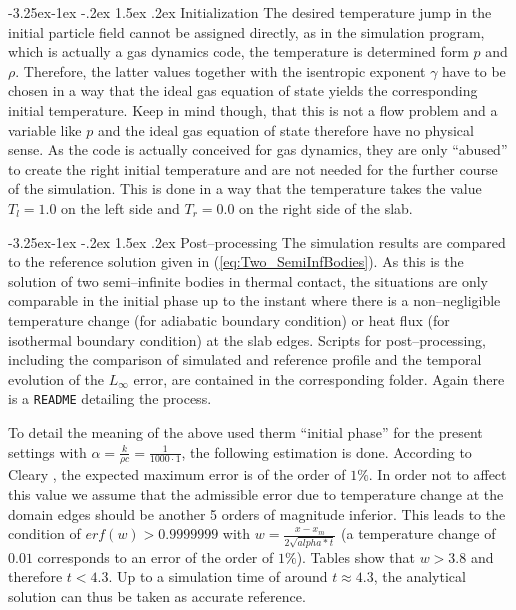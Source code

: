 \documentclass{report}
\makeatletter
\renewcommand\paragraph{\@startsection{paragraph}{4}{\z@}%
  {-3.25ex\@plus -1ex \@minus -.2ex}%
  {1.5ex \@plus .2ex}%
  {\normalfont\normalsize\bfseries}}
\makeatother
\begin{document}
\paragraph{Initialization}
The desired temperature jump in the initial particle field cannot be assigned directly, as in the simulation program, which is actually a gas dynamics code, the temperature is determined form $p$ and $\rho$. Therefore, the latter values together with the isentropic exponent $\gamma$ have to be chosen in a way that the ideal gas equation of state yields the corresponding initial temperature. Keep in mind though, that this is not a flow problem and a variable like $p$ and the ideal gas equation of state therefore have no physical sense. As the code is actually conceived for gas dynamics, they are only ``abused'' to create the right initial temperature  and are not needed for the further course of the simulation.
This is done in a way that the temperature takes the value $T_l=1.0$ on the left side and $T_r=0.0$ on the right side of the slab.



\paragraph{Post--processing}
The simulation results are compared to the reference solution given in (\ref{eq:Two_SemiInfBodies}). As this is the solution of two semi--infinite bodies in thermal contact, the situations are only comparable in the initial phase up to the instant where there is a non--negligible temperature change (for adiabatic boundary condition) or heat flux (for isothermal boundary condition) at the slab edges.
Scripts for post--processing, including the comparison of simulated and reference profile and the temporal evolution of the $L_\infty$ error, are contained in the corresponding folder. Again there is a {\tt README} detailing the process.

To detail the meaning of the above used therm ``initial phase'' for the present settings with $\alpha=\frac{k}{\rho c}=\frac{1}{1000\cdot 1}$, the following estimation is done. According to Cleary \cite{Cleary1999}, the expected maximum error is of the order of $1\%$. In order not to affect this value we assume that the admissible error due to temperature change at the domain edges should be another 5 orders of magnitude inferior. This leads to the condition of $erf(w)>0.9999999$ 
with $w=\frac{x-x_m}{2\sqrt{alpha*t}}$ (a temperature change of $0.01$ corresponds to an error of the order of $1\%$). Tables show that $w>3.8$ and therefore $t<4.3$. Up to a simulation time of around $t\approx 4.3$, the analytical solution can thus be taken as accurate reference. 
\end{document}
